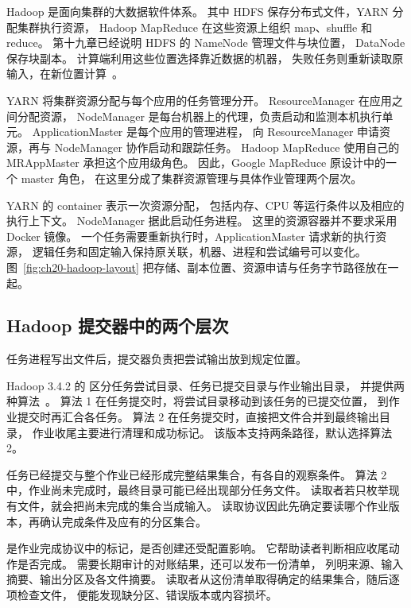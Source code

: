 Hadoop 是面向集群的大数据软件体系。
其中 HDFS 保存分布式文件，YARN 分配集群执行资源，
Hadoop MapReduce 在这些资源上组织 map、shuffle 和 reduce。
第十九章已经说明 HDFS 的 NameNode 管理文件与块位置，
DataNode 保存块副本。
计算端利用这些位置选择靠近数据的机器，
失败任务则重新读取原输入，在新位置计算~\cite{hadoop342-mapreduce,hadoop342-yarn}。

YARN 将集群资源分配与每个应用的任务管理分开。
ResourceManager 在应用之间分配资源，
NodeManager 是每台机器上的代理，负责启动和监测本机执行单元。
ApplicationMaster 是每个应用的管理进程，
向 ResourceManager 申请资源，再与 NodeManager 协作启动和跟踪任务。
Hadoop MapReduce 使用自己的 MRAppMaster 承担这个应用级角色。
因此，Google MapReduce 原设计中的一个 master 角色，
在这里分成了集群资源管理与具体作业管理两个层次。

YARN 的 container 表示一次资源分配，
包括内存、CPU 等运行条件以及相应的执行上下文。
NodeManager 据此启动任务进程。
这里的资源容器并不要求采用 Docker 镜像。
一个任务需要重新执行时，ApplicationMaster 请求新的执行资源，
逻辑任务和固定输入保持原关联，机器、进程和尝试编号可以变化。
图~\ref{fig:ch20-hadoop-layout} 把存储、副本位置、资源申请与任务字节路径放在一起。


\subsection{Hadoop 提交器中的两个层次}

任务进程写出文件后，提交器负责把尝试输出放到规定位置。

Hadoop 3.4.2 的 
区分任务尝试目录、任务已提交目录与作业输出目录，
并提供两种算法~\cite{hadoop342-committer}。
算法 1 在任务提交时，将尝试目录移动到该任务的已提交位置，
到作业提交时再汇合各任务。
算法 2 在任务提交时，直接把文件合并到最终输出目录，
作业收尾主要进行清理和成功标记。
该版本支持两条路径，默认选择算法 2。

任务已经提交与整个作业已经形成完整结果集合，有各自的观察条件。
算法 2 中，作业尚未完成时，最终目录可能已经出现部分任务文件。
读取者若只枚举现有文件，就会把尚未完成的集合当成输入。
读取协议因此先确定要读哪个作业版本，再确认完成条件及应有的分区集合。


 是作业完成协议中的标记，是否创建还受配置影响。
它帮助读者判断相应收尾动作是否完成。
需要长期审计的对账结果，还可以发布一份清单，
列明来源、输入摘要、输出分区及各文件摘要。
读取者从这份清单取得确定的结果集合，随后逐项检查文件，
便能发现缺分区、错误版本或内容损坏。

